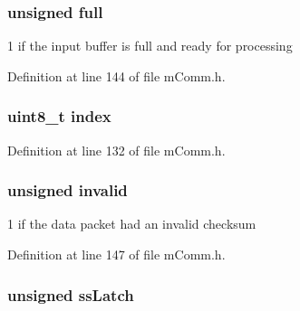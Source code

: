 \subsubsection[{full}]{\setlength{\rightskip}{0pt plus 5cm}unsigned full}\label{structm_comm___input_buffer_a69e2d5ccbb19f5e4b8bc58074fca8f54}


\textquotesingle{}1\textquotesingle{} if the input buffer is full and ready for processing 



Definition at line 144 of file m\+Comm.\+h.

\hypertarget{structm_comm___input_buffer_aae5a12e607d0f782506d9e6ec6179c64}{}
\subsubsection[{index}]{\setlength{\rightskip}{0pt plus 5cm}uint8\+\_\+t index}\label{structm_comm___input_buffer_aae5a12e607d0f782506d9e6ec6179c64}


Definition at line 132 of file m\+Comm.\+h.

\hypertarget{structm_comm___input_buffer_a066d82270b94fbd24c215e42052f8c33}{}
\subsubsection[{invalid}]{\setlength{\rightskip}{0pt plus 5cm}unsigned invalid}\label{structm_comm___input_buffer_a066d82270b94fbd24c215e42052f8c33}


\textquotesingle{}1\textquotesingle{} if the data packet had an invalid checksum 



Definition at line 147 of file m\+Comm.\+h.

\hypertarget{structm_comm___input_buffer_a562a2e23a37e69c437ce24e2af6b408b}{}
\subsubsection[{ss\+Latch}]{\setlength{\rightskip}{0pt plus 5cm}unsigned ss\+Latch}\label{structm_comm___input_buffer_a562a2e23a37e69c437ce24e2af6b408b}


